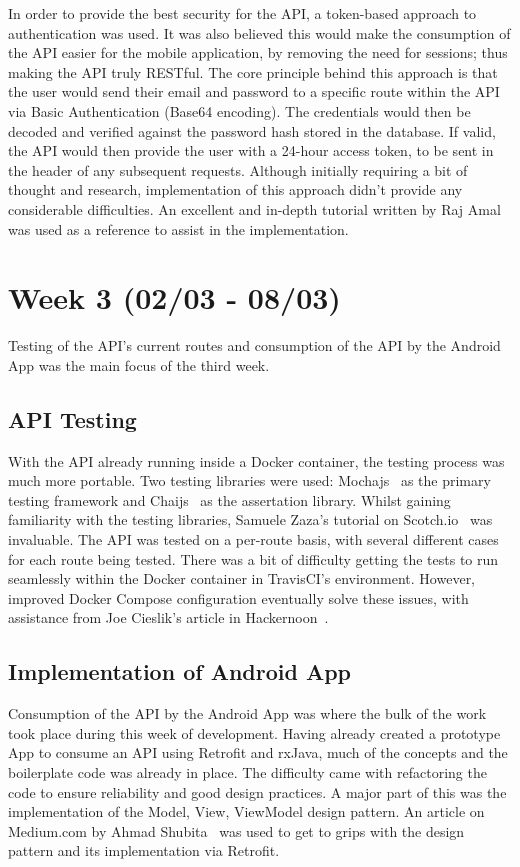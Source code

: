 In order to provide the best security for the API, a token-based approach to authentication was used. It was also believed this would make the consumption of the API easier for the mobile application, by removing the need for sessions; thus making the API truly RESTful. The core principle behind this approach is that the user would send their email and password to a specific route within the API via Basic Authentication (Base64 encoding). The credentials would then be decoded and verified against the password hash stored in the database. If valid, the API would then provide the user with a 24-hour access token, to be sent in the header of any subsequent requests. Although initially requiring a bit of thought and research, implementation of this approach didn't provide any considerable difficulties. An excellent and in-depth tutorial written by Raj Amal~\cite{nodejs_authentication_tutorial_ref} was used as a reference to assist in the implementation.

\section{Week 3 (02/03 - 08/03)}
Testing of the API's current routes and consumption of the API by the Android App was the main focus of the third week.

\subsection{API Testing}
With the API already running inside a Docker container, the testing process was much more portable. Two testing libraries were used: Mochajs~\cite{mocha_documentation_ref} as the primary testing framework and Chaijs~\cite{chai_documentation_ref} as the assertation library. Whilst gaining familiarity with the testing libraries, Samuele Zaza's tutorial on Scotch.io~\cite{mocha_chai_tutorial_ref} was invaluable. The API was tested on a per-route basis, with several different cases for each route being tested. There was a bit of difficulty getting the tests to run seamlessly within the Docker container in TravisCI's environment. However, improved Docker Compose configuration eventually solve these issues, with assistance from Joe Cieslik's article in Hackernoon~\cite{docker_testing_tutorial_ref}.

\subsection{Implementation of Android App}
Consumption of the API by the Android App was where the bulk of the work took place during this week of development. Having already created a prototype App to consume an API using Retrofit and rxJava, much of the concepts and the boilerplate code was already in place. The difficulty came with refactoring the code to ensure reliability and good design practices. A major part of this was the implementation of the Model, View, ViewModel design pattern. An article on Medium.com by Ahmad Shubita~\cite{mvvm_tutorial_ref} was used to get to grips with the design pattern and its implementation via Retrofit.

